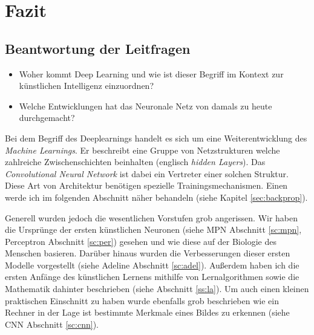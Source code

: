 \section{Fazit}


\subsection{Beantwortung der Leitfragen}

\begin{itemize}
\item Woher kommt Deep Learning und wie ist dieser Begriff im Kontext zur künstlichen Intelligenz einzuordnen?
\item Welche Entwicklungen hat das Neuronale Netz von damals zu heute durchgemacht?
\end{itemize}

Bei dem Begriff des Deeplearnings handelt es sich um eine Weiterentwicklung des \emph{Machine Learnings}. Er beschreibt eine Gruppe von Netzstrukturen welche zahlreiche Zwischenschichten beinhalten (englisch \emph{hidden Layers}). Das \emph{Convolutional Neural Network} ist dabei ein Vertreter einer solchen Struktur. Diese Art von Architektur benötigen spezielle Trainingsmechanismen. Einen werde ich im folgenden Abschnitt näher behandeln (siehe Kapitel \ref{sec:backprop}). 

Generell wurden jedoch die wesentlichen Vorstufen grob angerissen. Wir haben die Ursprünge der ersten künstlichen Neuronen (siehe MPN Abschnitt \ref{sc:mpn}, Perceptron Abschnitt \ref{sc:per}) gesehen und wie diese auf der Biologie des Menschen basieren. Darüber hinaus wurden die Verbesserungen dieser ersten Modelle vorgestellt (siehe Adeline Abschnitt \ref{sc:adel}). Außerdem haben ich die ersten Anfänge des künstlichen Lernens mithilfe von Lernalgorithmen sowie die Mathematik dahinter beschrieben (siehe Abschnitt \ref{ss:la}). Um auch einen kleinen praktischen Einschnitt zu haben wurde ebenfalls grob beschrieben wie ein Rechner in der Lage ist bestimmte Merkmale eines Bildes zu erkennen (siehe CNN Abschnitt \ref{sc:cnn}). 
